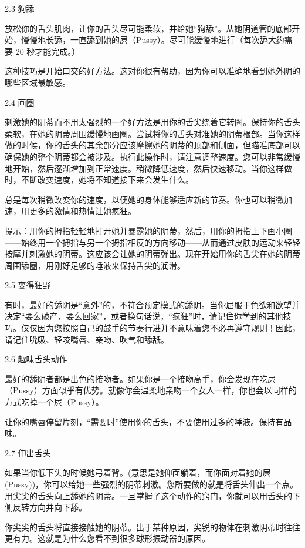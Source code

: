 \documentclass[12pt,UTF8]{ctexbook}
\begin{document}
2.3 狗舔

放松你的舌头肌肉，让你的舌头尽可能柔软，并给她“狗舔”。从她阴道管的底部开始，慢慢地长舔，一直舔到她的屄（Pussy）。尽可能缓慢地进行（每次舔大约需要 20 秒才能完成。）

这种技巧是开始口交的好方法。这对你很有帮助，因为你可以准确地看到她外阴的哪些区域最敏感。

2.4 画圈

刺激她的阴蒂而不用太强烈的一个好方法是用你的舌尖绕着它转圈。保持你的舌头柔软，在她的阴蒂周围缓慢地画圈。尝试将你的舌头对准她的阴蒂根部。当你这样做的时候，你的舌头的其余部分应该摩擦她的阴蒂的顶部和侧面，但瞄准底部可以确保她的整个阴蒂都会被涉及。执行此操作时，请注意调整速度。您可以非常缓慢地开始，然后逐渐增加到正常速度。稍微降低速度，然后快速移动。当你这样做时，不断改变速度，她将不知道接下来会发生什么。

总是每次稍微改变你的速度，以便她的身体能够适应新的节奏。你也可以稍微加速，用更多的激情和热情让她疯狂。

提示：用你的拇指轻轻地打开她并暴露她的阴蒂，然后，用你的拇指上下画小圈——始终用一个拇指与另一个拇指相反的方向移动——从而通过皮肤的运动来轻轻按摩并刺激她的阴蒂。这应该会让她的阴蒂弹出。现在开始用你的舌尖在她的阴蒂周围舔圈，用刚好足够的唾液来保持舌尖的润滑。

2.5 变得狂野

有时，最好的舔阴是“意外”的，不符合预定模式的舔阴。当你屈服于色欲和欲望并决定“要么破产，要么回家”，或者换句话说，“疯狂”时，请记住你学到的其他技巧。仅仅因为您按照自己的鼓手的节奏行进并不意味着您不必再遵守规则！因此，请记住吮吸、轻咬嘴唇、亲吻、吹气和舔舐。

2.6 趣味舌头动作

最好的舔阴者都是出色的接吻者。如果你是一个接吻高手，你会发现在吃屄（Pussy）方面似乎有优势。就像你会温柔地亲吻一个女人一样，你也会以同样的方式吃掉一个屄（Pussy）。

让你的嘴唇停留片刻，“需要时”使用你的舌头，不要使用过多的唾液。保持有品味。

2.7 伸出舌头

如果当你低下头的时候她弓着背。(意思是她仰面躺着，而你面对着她的屄(Pussy))，你可以给她一些强烈的阴蒂刺激。您所要做的就是将舌头伸出一个点。用尖尖的舌头向上舔她的阴蒂。一旦掌握了这个动作的窍门，你就可以用舌头的下侧反转方向并向下舔。

你尖尖的舌头将直接接触她的阴蒂。出于某种原因，尖锐的物体在刺激阴蒂时往往更有力。这就是为什么您看不到很多球形振动器的原因。
\end{document}
